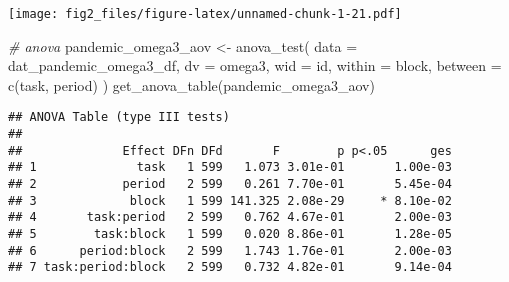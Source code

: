 \documentclass[
]{article}
\newenvironment{Shaded}{\begin{snugshade}}{\end{snugshade}}
\newcommand{\AttributeTok}[1]{\textcolor[rgb]{0.77,0.63,0.00}{#1}}
\newcommand{\CommentTok}[1]{\textcolor[rgb]{0.56,0.35,0.01}{\textit{#1}}}
\newcommand{\FunctionTok}[1]{\textcolor[rgb]{0.00,0.00,0.00}{#1}}
\newcommand{\NormalTok}[1]{#1}
\newcommand{\OtherTok}[1]{\textcolor[rgb]{0.56,0.35,0.01}{#1}}
\begin{document}
\texttt{[image: fig2\_files/figure-latex/unnamed-chunk-1-21.pdf]}

\begin{Shaded}
\begin{Highlighting}[]
\CommentTok{\# anova}
\NormalTok{pandemic\_omega3\_aov }\OtherTok{\textless{}{-}} \FunctionTok{anova\_test}\NormalTok{(}
  \AttributeTok{data =}\NormalTok{ dat\_pandemic\_omega3\_df, }\AttributeTok{dv =}\NormalTok{ omega3, }\AttributeTok{wid =}\NormalTok{ id,}
  \AttributeTok{within =}\NormalTok{ block, }\AttributeTok{between =} \FunctionTok{c}\NormalTok{(task, period)}
\NormalTok{)}
\FunctionTok{get\_anova\_table}\NormalTok{(pandemic\_omega3\_aov)}
\end{Highlighting}
\end{Shaded}

\begin{verbatim}
## ANOVA Table (type III tests)
## 
##              Effect DFn DFd       F        p p<.05      ges
## 1              task   1 599   1.073 3.01e-01       1.00e-03
## 2            period   2 599   0.261 7.70e-01       5.45e-04
## 3             block   1 599 141.325 2.08e-29     * 8.10e-02
## 4       task:period   2 599   0.762 4.67e-01       2.00e-03
## 5        task:block   1 599   0.020 8.86e-01       1.28e-05
## 6      period:block   2 599   1.743 1.76e-01       2.00e-03
## 7 task:period:block   2 599   0.732 4.82e-01       9.14e-04
\end{verbatim}
\end{document}
